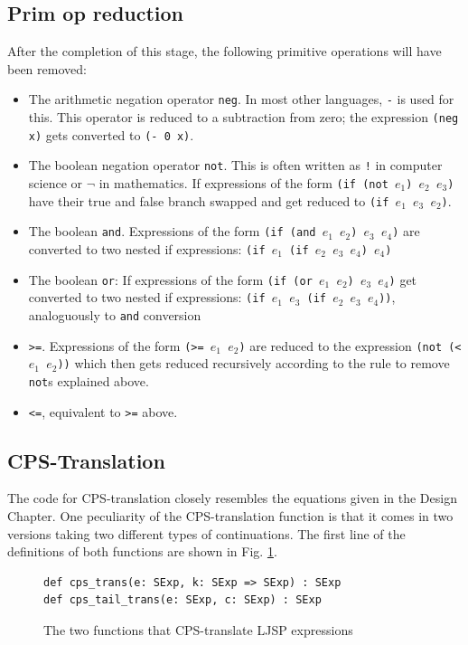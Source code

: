 \documentclass[11pt]{report}
\begin{document}
\subsection{Prim op reduction}
After the completion of this stage, the following primitive operations will have been removed: 
\begin{itemize}
\item The arithmetic negation operator \texttt{neg}. In most other languages, \texttt{-} is used for this. This operator is reduced to a subtraction from zero; the expression \texttt{(neg x)} gets converted to \texttt{(- 0 x)}.
\item The boolean negation operator \texttt{not}. This is often written as \texttt{!} in computer science or $\neg$ in mathematics. If expressions of the form \texttt{(if (not $e_1$) $e_2$ $e_3$)} have their true and false branch swapped and get reduced to \texttt{(if $e_1$ $e_3$ $e_2$)}.
\item The boolean \texttt{and}. Expressions of the form \texttt{(if (and $e_1$ $e_2$) $e_3$ $e_4$)} are converted to two nested if expressions: \texttt{(if $e_1$ (if $e_2$ $e_3$ $e_4$) $e_4$)}
\item The boolean \texttt{or}: If expressions of the form \texttt{(if (or $e_1$ $e_2$) $e_3$ $e_4$)} get converted to two nested if expressions: \texttt{(if $e_1$ $e_3$ (if $e_2$ $e_3$ $e_4$))}, analoguously to \texttt{and} conversion
\item \texttt{>=}. Expressions of the form \texttt{(>= $e_1$ $e_2$)} are reduced to the expression \texttt{(not (< $e_1$ $e_2$))} which then gets reduced recursively according to the rule to remove \texttt{not}s explained above.
\item \texttt{<=}, equivalent to \texttt{>=} above.
\end{itemize}

\subsection{CPS-Translation}
The code for CPS-translation closely resembles the equations given in the Design Chapter. One peculiarity of the CPS-translation function is that it comes in two versions taking two different types of continuations. The first line of the definitions of both functions are shown in Fig. \ref{cpstranstwofuncs}.

\begin{figure}[ht]
\begin{lstlisting}
def cps_trans(e: SExp, k: SExp => SExp) : SExp
def cps_tail_trans(e: SExp, c: SExp) : SExp
\end{lstlisting}
\caption{The two functions that CPS-translate LJSP expressions}
\label{cpstranstwofuncs}
\end{figure}
\end{document}
